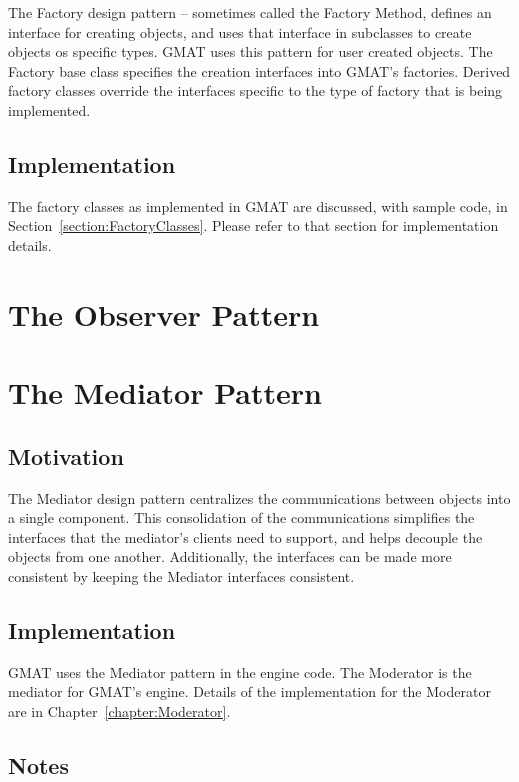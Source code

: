 The Factory design pattern -- sometimes called the Factory Method, defines an interface for creating
objects, and uses that interface in subclasses to create objects os specific types.  GMAT uses this
pattern for user created objects.  The Factory base class specifies the creation interfaces into
GMAT's factories.  Derived factory classes override the interfaces specific to the type of factory
that is being implemented.

\subsection{Implementation}

The factory classes as implemented in GMAT are discussed, with sample code, in
Section~\ref{section:FactoryClasses}.  Please refer to that section for implementation details.

\section{The Observer Pattern}


\section{\label{section:MediatorPattern}The Mediator Pattern}

\subsection{Motivation}

The Mediator design pattern centralizes the communications between objects into a single component.
 This consolidation of the communications simplifies the interfaces that the mediator's clients
need to support, and helps decouple the objects from one another.  Additionally, the interfaces can
be made more consistent by keeping the Mediator interfaces consistent.

\subsection{Implementation}

GMAT uses the Mediator pattern in the engine code.  The Moderator is the mediator for GMAT's
engine.  Details of the implementation for the Moderator are in Chapter~\ref{chapter:Moderator}.

\subsection{Notes}

